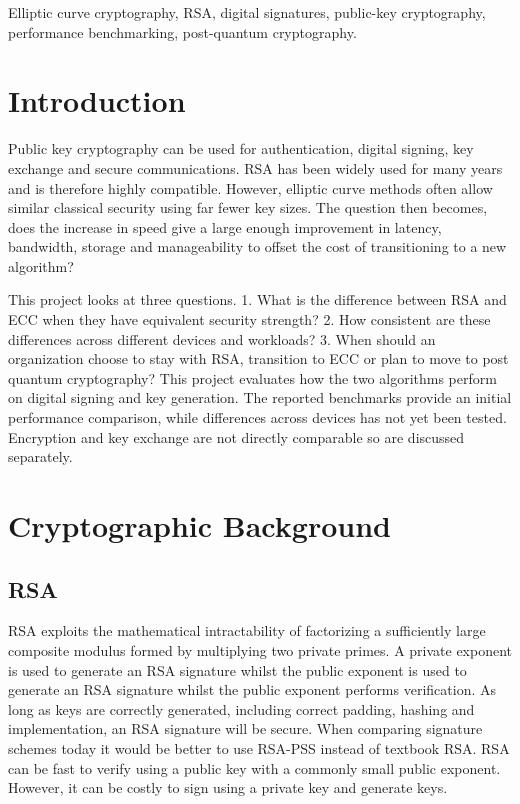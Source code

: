 \documentclass[conference]{IEEEtran}
\begin{document}
\begin{IEEEkeywords}
Elliptic curve cryptography, RSA, digital signatures, public-key cryptography, performance benchmarking, post-quantum cryptography.
\end{IEEEkeywords}

\section{Introduction}
Public key cryptography can be used for authentication, digital signing, key exchange and secure communications. RSA has been widely used for many years and is therefore highly compatible. However, elliptic curve methods often allow similar classical security using far fewer key sizes. The question then becomes, does the increase in speed give a large enough improvement in latency, bandwidth, storage and manageability to offset the cost of transitioning to a new algorithm?

This project looks at three questions. 1. What is the difference between RSA and ECC when they have equivalent security strength? 2. How consistent are these differences across different devices and workloads? 3. When should an organization choose to stay with RSA, transition to ECC or plan to move to post quantum cryptography? This project evaluates how the two algorithms perform on digital signing and key generation. The reported benchmarks provide an initial performance comparison, while differences across devices has not yet been tested. Encryption and key exchange are not directly comparable so are discussed separately. 


\section{Cryptographic Background}

\subsection{RSA}

RSA exploits the mathematical intractability of factorizing a sufficiently large composite modulus formed by multiplying two private primes. A private exponent is used to generate an RSA signature whilst the public exponent is used to generate an RSA signature whilst the public exponent performs verification. As long as keys are correctly generated, including correct padding, hashing and implementation, an RSA signature will be secure. When comparing signature schemes today it would be better to use RSA-PSS \cite{b1} instead of textbook RSA. RSA can be fast to verify using a public key with a commonly small public exponent. However, it can be costly to sign using a private key and generate keys.  
\end{document}
